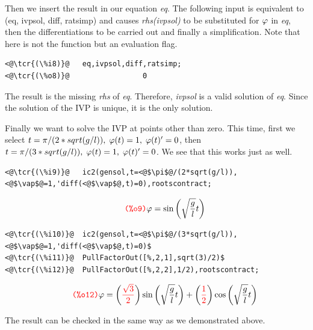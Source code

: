 \documentclass[../Maxima_Workbook.tex]{subfiles}
\begin{document}
\lz Then we insert the result in our equation \emph{eq}. The following input is equivalent to (eq, ivpsol, diff, ratsimp) and causes \emph{rhs(ivpsol)} to be substituted for $ \varphi $ in \emph{eq}, then the differentiations to be carried out and finally a simplification. Note that  here is not the function but an evaluation flag.

\lz \begin{small}
\color{blue}
\begin{lstlisting}
<@\tcr{(\%i8)}@   eq,ivpsol,diff,ratsimp;
<@\tcr{(\%o8)}@			        0
\end{lstlisting}
\color{black}
\end{small} \vspace{-1mm}

\lz The result is the missing \emph{rhs} of \emph{eq}. Therefore, \emph{ivpsol} is a valid solution of \emph{eq}. Since the solution of the IVP is unique, it is the only solution.

\lz Finally we want to solve the IVP at points other than zero. This time, first we select $ t=\pi/(2*sqrt(g/l)), \; \varphi(t)=1, \; \varphi(t)'=0 $, then $ t=\pi/(3*sqrt(g/l)), \; \varphi(t)=1, \; \varphi(t)'=0 $. We see that this works just as well.

\lz \begin{small}
\color{blue} \leqn
\begin{lstlisting}
<@\tcr{(\%i9)}@   ic2(gensol,t=<@$\pi$@/(2*sqrt(g/l)),<@$\vap$@=1,'diff(<@$\vap$@,t)=0),rootscontract;
\end{lstlisting}
\vspace{-4mm} \[\tag*{\tcr{\ttfamily (\%o9)}} \vap =\sin{\left( \sqrt{\frac{g}{l}} t\right) } \]
\vspace{-5mm} \begin{lstlisting}
<@\tcr{(\%i10)}@  ic2(gensol,t=<@$\pi$@/(3*sqrt(g/l)),<@$\vap$@=1,'diff(<@$\vap$@,t)=0)$
<@\tcr{(\%i11)}@  PullFactorOut([%,2,1],sqrt(3)/2)$
<@\tcr{(\%i12)}@  PullFactorOut([%,2,2],1/2),rootscontract;
\end{lstlisting}
\vspace{-4mm} \[\tag*{\tcr{\ttfamily (\%o12)}} \vap =\left( \tcr{\frac{\sqrt{3}}{2}}\right)  \sin{\left( \sqrt{\frac{g}{l}} t\right) }+\left( \tcr{\frac{1}{2}}\right)  \cos{\left( \sqrt{\frac{g}{l}} t\right) } \]
\color{black} \reqn
\end{small} \vspace{-4mm}

\lz The result can be checked in the same way as we demonstrated above.
\end{document}
